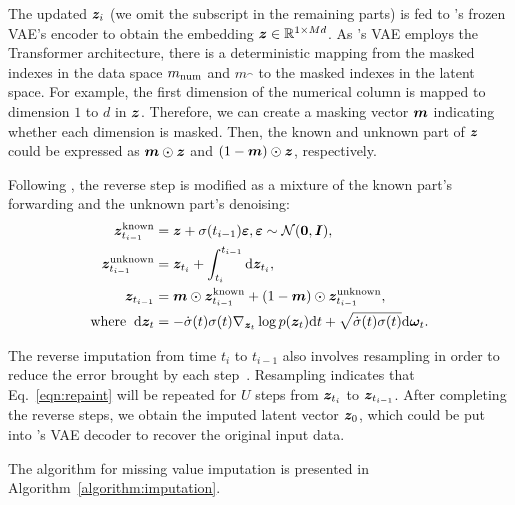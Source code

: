 The updated ${\bm{z}}_i$ (we omit the subscript in the remaining parts) is fed to \modelname's frozen VAE's encoder to obtain the embedding ${\bm{z}} \in {\mathbb{R}}^{1 \times Md}$. As \modelname's VAE employs the Transformer architecture, there is a deterministic mapping from the masked indexes in the data space ${m}_{{\rm num}}$ and ${m}_{\cat}$ to the masked indexes in the latent space. For example, the first dimension of the numerical column is mapped to dimension $1$ to $d$ in ${\bm{z}}$. Therefore, we can create a masking vector ${\bm{m}}$ indicating whether each dimension is masked. Then, the known and unknown part of ${\bm{z}}$ could be expressed as ${\bm{m}} \odot {\bm{z}}$ and $(1-{\bm{m}}) \odot {\bm{z}}$, respectively.

Following \citet{repaint}, the reverse step is modified as a mixture of the known part's forwarding and the unknown part's denoising:
\begin{equation}\label{eqn:repaint}
\begin{split}
    {\bm{z}}_{t_{i-1}}^{\rm known} & = {\bm{z}} + \sigma(t_{i-1}) \bm{\varepsilon}, \bm{\varepsilon} \sim {\mathcal{N}}(\bm{0}, {\bm{I}}), \\
 {\bm{z}}_{t_{i-1}}^{\rm unknown} & = {\bm{z}}_{t_i} + \int_{t_i}^{t_{i-1}} {\rm d}{\bm{z}}_{t_i},  \\
    {\bm{z}}_{t_{i-1}} & = {\bm{m}} \odot {\bm{z}}_{t_{i-1}}^{\rm known} + (1-{\bm{m}}) \odot {\bm{z}}_{t_{i-1}}^{\rm unknown},  \\
 \text{where} \;\; {\rm d}{\bm{z}}_t & =  -\dot{\sigma}(t) \sigma(t) \nabla_{{\bm{z}}_t} \log p({\bm{z}}_t) {\rm d}t + \sqrt{\dot{\sigma}(t) \sigma(t)} {\rm d} \bm{\omega}_t. \\
\end{split}
\end{equation}

The reverse imputation from time $t_i$ to $t_{i-1}$ also involves resampling in order to reduce the error brought by each step~\citep{repaint}. Resampling indicates that Eq.~\ref{eqn:repaint} will be repeated for $U$ steps from ${\bm{z}}_{t_i}$ to ${\bm{z}}_{t_{i-1}}$. After completing the reverse steps, we obtain the imputed latent vector ${\bm{z}}_0$, which could be put into \modelname's VAE decoder to recover the original input data.

The algorithm for missing value imputation is presented in Algorithm~\ref{algorithm:imputation}.

